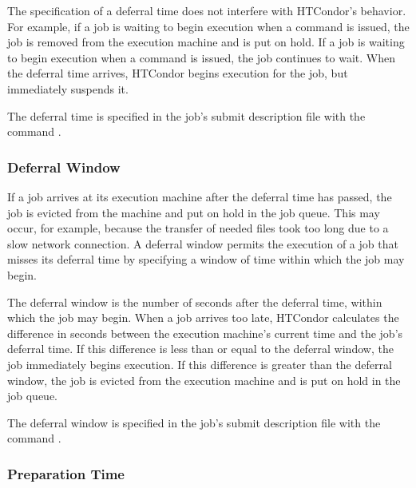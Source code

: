 The specification of a deferral time does not interfere
with HTCondor's behavior.
For example, if a job is waiting to begin execution
when a  command is issued,
the job is removed from the execution machine and is put on hold.
If a job is waiting to begin execution when 
a  command is issued,
the job continues to wait.
When the deferral time arrives,
HTCondor begins execution for the job,
but immediately suspends it.

The deferral time is specified in the job's submit description file
with the command .

\subsubsection{Deferral Window}
\label{sec:JobDeferral-DeferralWindow}

If a job arrives at its execution machine
after the deferral time has passed,
the job is evicted from the machine and put on hold in the job queue.
This may occur, for example,
because the transfer of needed files took too long
due to a slow network connection.
A deferral window permits the execution of a job
that misses its deferral time by specifying a window of
time within which the job may begin.

The deferral window 
is the number of seconds after the deferral time,
within which the job may begin.
When a job arrives too late,
HTCondor calculates the difference in seconds
between the execution machine's current time
and the job's deferral time.
If this difference is less than or equal to the deferral window,
the job immediately begins execution.
If this difference is greater than the deferral window,
the job is evicted from the execution machine
and is put on hold in the job queue.

The deferral window is specified in the job's submit description file
with the command .

\subsubsection{Preparation Time}
\label{sec:JobDeferral-PrepTime}

